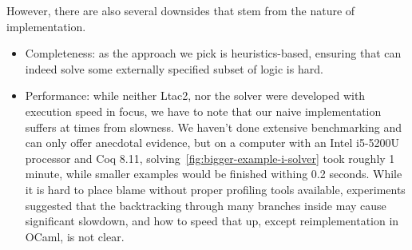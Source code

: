 However, there are also several downsides that stem from the nature of implementation.
\begin{itemize}
\item Completeness: as the approach we pick is heuristics-based, ensuring that  can indeed solve some externally specified subset of logic is hard.
\item Performance: while neither Ltac2, nor the solver were developed with execution speed in focus, we have to note that our naive implementation suffers at times from slowness.
  We haven't done extensive benchmarking and can only offer anecdotal evidence, but on a computer with an Intel i5-5200U processor and Coq 8.11, solving~\ref{fig:bigger-example-i-solver} took roughly 1 minute, while smaller examples would be finished withing 0.2 seconds.
  While it is hard to place blame without proper profiling tools available, experiments suggested that the backtracking through many branches inside  may cause significant slowdown, and how to speed that up, except reimplementation in OCaml, is not clear.
\end{itemize}


